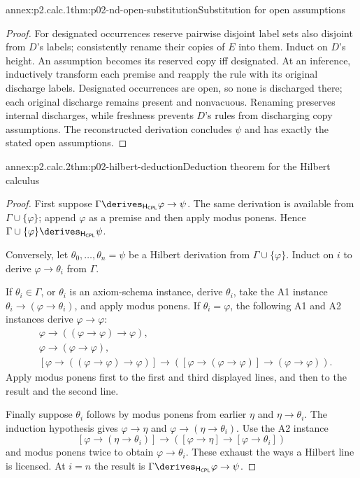 
\begin{annexitem}{annex:p2.calc.1}{thm:p02-nd-open-substitution}{Substitution for open assumptions}
\begin{proof}
For designated occurrences reserve pairwise disjoint label sets also
disjoint from \(D\)'s labels; consistently rename their copies of \(E\) into
them.  Induct on \(D\)'s height.  An assumption becomes its reserved copy iff
designated.  At an inference, inductively transform each premise and reapply
the rule with its original discharge labels.  Designated occurrences are
open, so none is discharged there; each original discharge remains present
and nonvacuous.  Renaming preserves internal discharges, while freshness
prevents \(D\)'s rules from discharging copy assumptions.  The reconstructed
derivation concludes \(\psi\) and has exactly the stated open assumptions.
\end{proof}
\end{annexitem}

\begin{annexitem}{annex:p2.calc.2}{thm:p02-hilbert-deduction}{Deduction theorem for the Hilbert calculus}
\begin{proof}
First suppose
\(\Gamma\derives_{\mathsf H_{\mathsf{CPL}}}\varphi\to\psi\).
The same derivation is available from \(\Gamma\cup\{\varphi\}\); append
\(\varphi\) as a premise and then apply modus ponens.  Hence
\(\Gamma\cup\{\varphi\}\derives_{\mathsf H_{\mathsf{CPL}}}\psi\).

Conversely, let \(\theta_0,\ldots,\theta_n=\psi\) be a Hilbert derivation
from \(\Gamma\cup\{\varphi\}\).  Induct on \(i\) to derive
\(\varphi\to\theta_i\) from \(\Gamma\).

If \(\theta_i\in\Gamma\), or \(\theta_i\) is an axiom-schema instance,
derive \(\theta_i\), take the A1 instance
\(\theta_i\to(\varphi\to\theta_i)\), and apply modus ponens.  If
\(\theta_i=\varphi\), the following A1 and A2 instances derive
\(\varphi\to\varphi\):
\[
\begin{aligned}
 &\varphi\to((\varphi\to\varphi)\to\varphi),\\
 &\varphi\to(\varphi\to\varphi),\\
 &[\varphi\to((\varphi\to\varphi)\to\varphi)]
   \to([\varphi\to(\varphi\to\varphi)]
   \to(\varphi\to\varphi)).
\end{aligned}
\]
Apply modus ponens first to the first and third displayed lines, and then to
the result and the second line.

Finally suppose \(\theta_i\) follows by modus ponens from earlier
\(\eta\) and \(\eta\to\theta_i\).  The induction hypothesis gives
\(\varphi\to\eta\) and \(\varphi\to(\eta\to\theta_i)\).  Use the A2
instance
\[
 [\varphi\to(\eta\to\theta_i)]
 \to([\varphi\to\eta]\to[\varphi\to\theta_i])
\]
and modus ponens twice to obtain \(\varphi\to\theta_i\).  These exhaust
the ways a Hilbert line is licensed.  At \(i=n\) the result is
\(\Gamma\derives_{\mathsf H_{\mathsf{CPL}}}\varphi\to\psi\).
\end{proof}
\end{annexitem}
